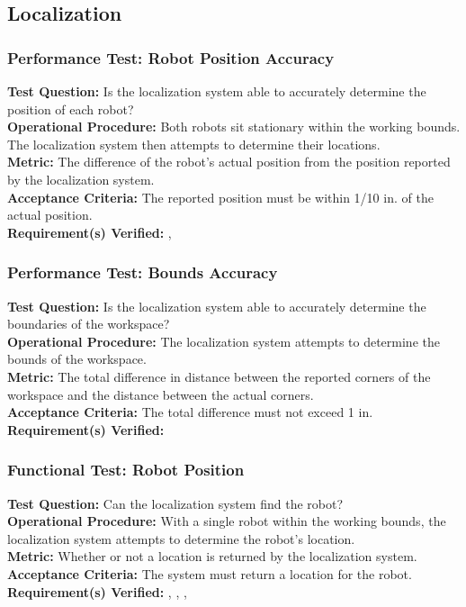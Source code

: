 
\subsection{Localization}
\label{sec:verification_localization}

\subsubsection{Performance Test: Robot Position Accuracy}
\label{test:localization_pt_accuracy}
\textbf{Test Question:} Is the localization system able to accurately determine the position of each robot?\\
\textbf{Operational Procedure:} Both robots sit stationary within the working bounds. The localization system then attempts to determine their locations.\\
\textbf{Metric:} The difference of the robot's actual position from the position reported by the localization system. \\
\textbf{Acceptance Criteria:} The reported position must be within 1/10 in. of the actual position.\\
\textbf{Requirement(s) Verified:} , 

\subsubsection{Performance Test: Bounds Accuracy}
\label{test:localization_pt_bounds}
\textbf{Test Question:} Is the localization system able to accurately determine the boundaries of the workspace?\\
\textbf{Operational Procedure:} The localization system attempts to determine the bounds of the workspace.\\
\textbf{Metric:} The total difference in distance between the reported corners of the workspace and the distance between the actual corners.\\
\textbf{Acceptance Criteria:} The total difference must not exceed 1 in.\\
\textbf{Requirement(s) Verified:} 

\subsubsection{Functional Test: Robot Position}
\label{test:localization_ft_robopos}
\textbf{Test Question:} Can the localization system find the robot?\\
\textbf{Operational Procedure:} With a single robot within the working bounds, the localization system attempts to determine the robot's location. \\
\textbf{Metric:} Whether or not a location is returned by the localization system.\\
\textbf{Acceptance Criteria:} The system must return a location for the robot. \\
\textbf{Requirement(s) Verified:} , , , 

